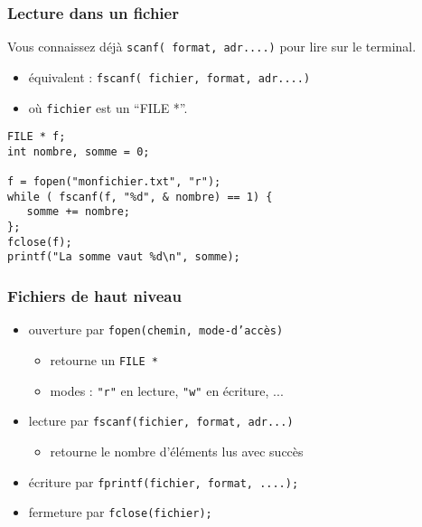 \documentclass[]{beamer}
\begin{document}
\begin{frame}[containsverbatim]
  \frametitle{Lecture dans un fichier}
Vous connaissez déjà \texttt{scanf( format, adr....)} pour lire sur le terminal.

\begin{itemize}
\item équivalent : \texttt{fscanf( fichier, format, adr....)}
\item où \texttt{fichier} est un ``FILE *''.
\end{itemize}

\begin{lstlisting}[style=sourceC]
FILE * f;
int nombre, somme = 0;

f = fopen("monfichier.txt", "r");
while ( fscanf(f, "%d", & nombre) == 1) {
   somme += nombre;
};
fclose(f);
printf("La somme vaut %d\n", somme);
\end{lstlisting}

\end{frame}


\begin{frame}
\frametitle{Fichiers de haut niveau}
\begin{itemize}
\item 
\alert{ouverture} par \texttt{fopen(chemin, mode-d'accès)}
\begin{itemize}
\item retourne un  \texttt{FILE *}
\item modes : \texttt{"r"} en lecture, \texttt{"w"} en écriture, ...
\end{itemize}
\item \alert{lecture} par \texttt{fscanf(fichier, format, adr...)}
\begin{itemize}
\item retourne
le nombre d'éléments lus avec succès
\end{itemize}
\item \alert{écriture} par \texttt{fprintf(fichier, format, ....);}
\item \alert{fermeture} par \texttt{fclose(fichier);}
\end{itemize}
\end{frame}
\end{document}
